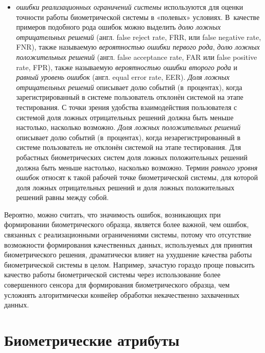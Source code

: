 \documentclass[12pt]{book}
\begin{document}
{\begin{itemize}[topsep=1pt]
\item \textit{ошибки реализационных ограничений системы} используются для оценки точности работы биометрической системы в «полевых» условиях. В~качестве примеров подобного рода ошибок можно выделить \textit{долю ложных отрицательных решений} (англ. false reject rate, FRR, или false negative rate, FNR), также называемую \textit{вероятностью ошибки первого рода}, \textit{долю ложных  положительных решений} (англ. false acceptance rate, FAR или false positive rate, FPR), также называемую \textit{вероятностью ошибки второго рода} и \textit{равный уровень ошибок} (англ. equal error rate, EER). \textit{Доля ложных отрицательных решений} описывает долю событий (в~процентах), когда зарегистрированный в системе пользователь отклонён системой на этапе тестирования. С точки зрения удобства взаимодействия пользователя с системой доля ложных отрицательных решений должна быть меньше настолько, насколько возможно. \textit{Доля ложных положительных решений} описывает долю событий (в~процентах), когда незарегистрированный в системе пользователь не отклонён системой на этапе тестирования. Для робастных биометрических систем доля ложных положительных решений должна быть меньше настолько, насколько возможно. Термин \textit{равного уровня ошибок} относят к такой рабочей точке биометрической системы, для которой доля ложных отрицательных решений и доля ложных положительных решений равны между собой.

\end{itemize}

Вероятно, можно считать, что значимость ошибок, возникающих при формировании биометрического образца, является более важной, чем ошибок, связанных с реализационными ограничениями системы, потому что отсутствие возможности формирования качественных данных, используемых для принятия биометрического решения, драматически влияет на ухудшение качества работы биометрической системы в целом. Например, зачастую гораздо проще повысить качество работы биометрической системы через использование более совершенного сенсора для формирования биометрического образца, чем усложнять алгоритмически конвейер обработки некачественно захваченных данных.
}

\section{Биометрические атрибуты}
\end{document}
